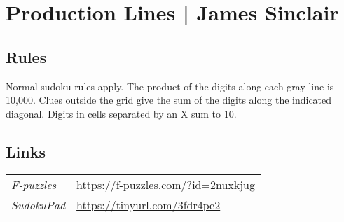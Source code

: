 \section{Production Lines | {\normalfont James Sinclair}}
\label{sec:25-production-lines-james-sinclair}

\subsection*{Rules}
\begin{markdown}
Normal sudoku rules apply. The product of the digits along each gray line is 10,000. Clues outside the grid give the sum of the digits along the indicated diagonal. Digits in cells separated by an X sum to 10.
\end{markdown}
\subsection*{Links}
\begin{tabularx}{\textwidth}{l X}
\emph{F-puzzles} & \url{https://f-puzzles.com/?id=2nuxkjug} \\
\emph{SudokuPad} & \url{https://tinyurl.com/3fdr4pe2} \\
\end{tabularx}
\pagebreak
